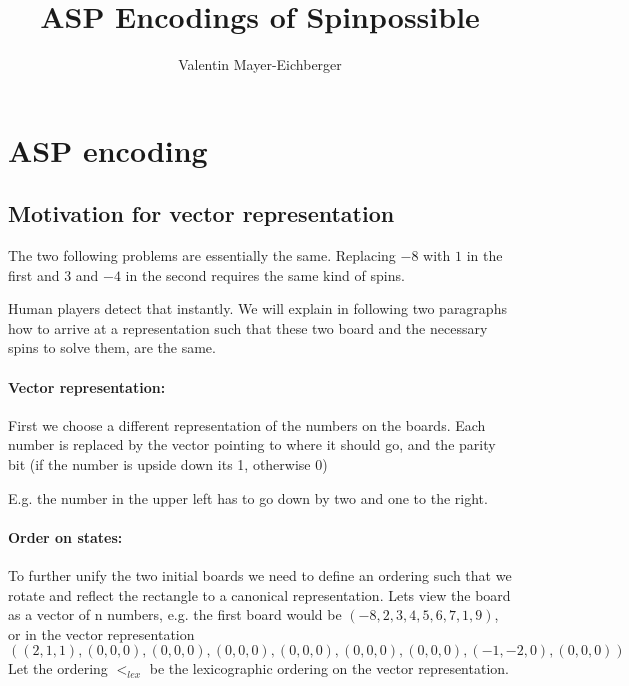 \documentclass[]{llncs}
\author{Valentin Mayer-Eichberger}
\institute{IVU Traffice Technologies\\ Bundesallee 88, 12000 Berlin\\
\email{vme@ivu.de}}
\title{ASP Encodings of Spinpossible}
\newcommand{\spintable}[9]{ 
\node [matrix,ampersand replacement=\&,nodes={minimum size=4mm}]
{
    \node {#1}; \& \node{#2}; \& \node {#3}; \\ 
    \node {#4}; \& \node{#5}; \& \node {#6}; \\ 
    \node {#7}; \& \node{#8}; \& \node {#9}; \\ 
}; 
}
\begin{document}
 \maketitle

\section{ASP encoding}



\subsection{Motivation for vector representation}

The two following problems are essentially the same. Replacing $-8$ with $1$ in the
first and $3$ and $-4$ in the second requires the same kind of spins. 


Human players detect that instantly. We will explain in following two paragraphs how
to arrive at a representation such that these two board and the necessary spins to
solve them, are the same. 

\paragraph{Vector representation: } First we choose a different representation of the
numbers on the boards. Each number is replaced by the vector pointing to where it
should go, and the parity bit (if the number is upside down its 1, otherwise 0)


E.g. the number in the upper left has to go down by two and one to the right. 


\paragraph{Order on states: } To further unify the two initial boards we need to
define an ordering such that we rotate and reflect the rectangle to a canonical
representation. Lets view the board as a vector of n numbers, e.g. the first board
would be $(-8,2,3,4,5,6,7,1,9)$, or in the vector representation 
\[
((2,1,1),(0,0,0),(0,0,0),(0,0,0),(0,0,0),(0,0,0),(0,0,0),(-1,-2,0),(0,0,0)) 
\] 
Let the ordering $<_{lex}$ be the lexicographic ordering on the vector representation.
\end{document}
